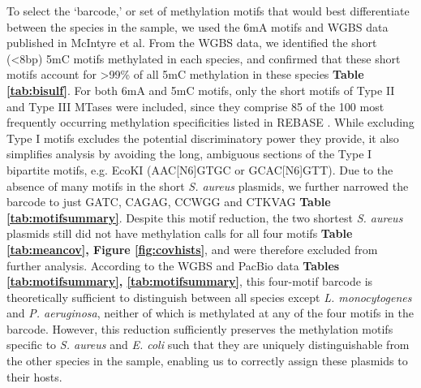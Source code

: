 To select the ‘barcode,’ or set of methylation motifs that would best differentiate between the species in the sample, we used the 6mA motifs and WGBS data published in McIntyre \citep{McIntyre2017-ed} et al. From the WGBS data, we identified the short (<8bp) 5mC motifs methylated in each species, and confirmed that these short motifs account for >99\% of all 5mC methylation in these species {\bf Table \ref{tab:bisulf}}. For both 6mA and 5mC motifs, only the short motifs of Type II and Type III MTases were included, since they comprise 85 of the 100 most frequently occurring methylation specificities listed in REBASE \citep{Roberts2003-ss}. While excluding Type I motifs excludes the potential discriminatory power they provide, it also simplifies analysis by avoiding the long, ambiguous sections of the Type I bipartite motifs, e.g. EcoKI (AAC[N6]GTGC or GCAC[N6]GTT). Due to the absence of many motifs in the short \textit{S. aureus} plasmids, we further narrowed the barcode to just GATC, CAGAG, CCWGG and CTKVAG {\bf Table \ref{tab:motifsummary}}. Despite this motif reduction, the two shortest \textit{S. aureus} plasmids still did not have methylation calls for all four motifs {\bf Table \ref{tab:meancov}, Figure \ref{fig:covhists}}, and were therefore excluded from further analysis. According to the WGBS and PacBio data \citep{McIntyre2017-ed} {\bf Tables \ref{tab:motifsummary}, \ref{tab:motifsummary}}, this four-motif barcode is theoretically sufficient to distinguish between all species except \textit{L. monocytogenes} and \textit{P. aeruginosa}, neither of which is methylated at any of the four motifs in the barcode. However, this reduction sufficiently preserves the methylation motifs specific to \textit{S. aureus} and \textit{E. coli} such that they are uniquely distinguishable from the other species in the sample, enabling us to correctly assign these plasmids to their hosts.


